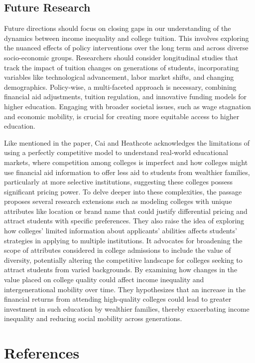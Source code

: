 \documentclass[
  letterpaper,
  DIV=11,
  numbers=noendperiod]{scrartcl}
\begin{document}
\subsection{Future Research}\label{future-research}

Future directions should focus on closing gaps in our understanding of
the dynamics between income inequality and college tuition. This
involves exploring the nuanced effects of policy interventions over the
long term and across diverse socio-economic groups. Researchers should
consider longitudinal studies that track the impact of tuition changes
on generations of students, incorporating variables like technological
advancement, labor market shifts, and changing demographics.
Policy-wise, a multi-faceted approach is necessary, combining financial
aid adjustments, tuition regulation, and innovative funding models for
higher education. Engaging with broader societal issues, such as wage
stagnation and economic mobility, is crucial for creating more equitable
access to higher education.

Like mentioned in the paper, Cai and Heathcote acknowledges the
limitations of using a perfectly competitive model to understand
real-world educational markets, where competition among colleges is
imperfect and how colleges might use financial aid information to offer
less aid to students from wealthier families, particularly at more
selective institutions, suggesting these colleges possess significant
pricing power. To delve deeper into these complexities, the passage
proposes several research extensions such as modeling colleges with
unique attributes like location or brand name that could justify
differential pricing and attract students with specific preferences.
They also raise the idea of exploring how colleges' limited information
about applicants' abilities affects students' strategies in applying to
multiple institutions. It advocates for broadening the scope of
attributes considered in college admissions to include the value of
diversity, potentially altering the competitive landscape for colleges
seeking to attract students from varied backgrounds. By examining how
changes in the value placed on college quality could affect income
inequality and intergenerational mobility over time. They hypothesizes
that an increase in the financial returns from attending high-quality
colleges could lead to greater investment in such education by wealthier
families, thereby exacerbating income inequality and reducing social
mobility across generations.

\newpage

\section{References}\label{references}
\end{document}
